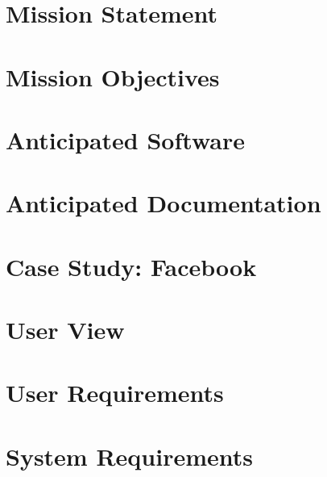 \chapter{Mission Statement}


\chapter{Mission Objectives}


\chapter{Anticipated Software}


\chapter{Anticipated Documentation}


\chapter{Case Study: Facebook}


\chapter{User View}


\chapter{User Requirements}


\chapter{System Requirements}

